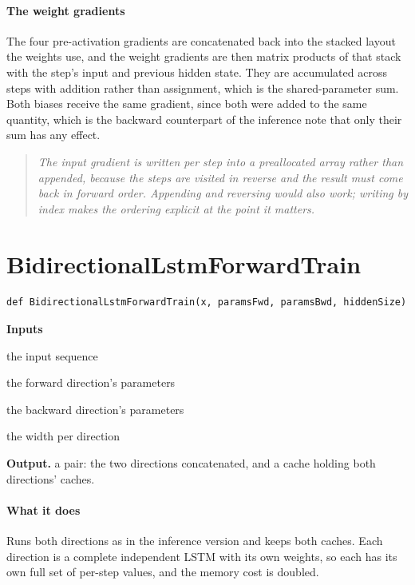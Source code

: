 \paragraph{The weight gradients}
The four pre-activation gradients are concatenated back into the stacked layout the weights use, and the weight gradients are then matrix products of that stack with the step's input and previous hidden state. They are accumulated across steps with addition rather than assignment, which is the shared-parameter sum. Both biases receive the same gradient, since both were added to the same quantity, which is the backward counterpart of the inference note that only their sum has any effect.


\begin{quote}\small\itshape The input gradient is written per step into a preallocated array rather than appended, because the steps are visited in reverse and the result must come back in forward order. Appending and reversing would also work; writing by index makes the ordering explicit at the point it matters.\end{quote}

\section{BidirectionalLstmForwardTrain}
\begin{lstlisting}[style=sig]
def BidirectionalLstmForwardTrain(x, paramsFwd, paramsBwd, hiddenSize)
\end{lstlisting}

\noindent\textbf{Inputs}
\begin{description}[leftmargin=2.2em,style=nextline,font=\normalfont\ttfamily]\setlength\itemsep{1pt}
  \item[{x}] \normalfont the input sequence
  \item[{paramsFwd}] \normalfont the forward direction's parameters
  \item[{paramsBwd}] \normalfont the backward direction's parameters
  \item[{hiddenSize}] \normalfont the width per direction
\end{description}

\noindent\textbf{Output.} a pair: the two directions concatenated, and a cache holding both directions' caches.


\paragraph{What it does}
Runs both directions as in the inference version and keeps both caches. Each direction is a complete independent LSTM with its own weights, so each has its own full set of per-step values, and the memory cost is doubled.



